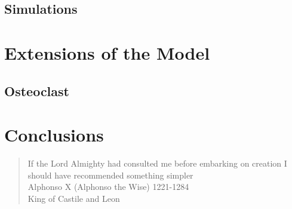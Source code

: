 \documentclass{beamer}
\begin{document}
\subsection{Simulations}

\section{Extensions of the Model}

\subsection{Osteoclast}

\section{Conclusions}




\begin{frame}{}
	\begin{quote}
		If the Lord Almighty had consulted me before embarking on creation I should have recommended something simpler\\
		Alphonso X (Alphonso the Wise) 1221-1284\\
		King of Castile and Leon
	\end{quote}
	
\end{frame}	



	
	
\end{document}
